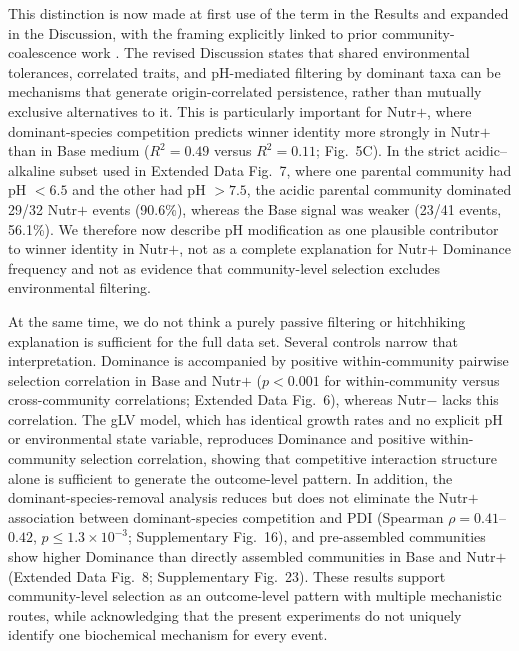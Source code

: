This distinction is now made at first use of the term in the Results and expanded in the Discussion, with the framing explicitly linked to prior community-coalescence work \citep{Mansour2018,Rillig2015}. The revised Discussion states that shared environmental tolerances, correlated traits, and pH-mediated filtering by dominant taxa can be mechanisms that generate origin-correlated persistence, rather than mutually exclusive alternatives to it. This is particularly important for Nutr$+$, where dominant-species competition predicts winner identity more strongly in Nutr$+$ than in Base medium ($R^2 = 0.49$ versus $R^2 = 0.11$; Fig.~5C). In the strict acidic--alkaline subset used in Extended Data Fig.~7, where one parental community had pH $<6.5$ and the other had pH $>7.5$, the acidic parental community dominated 29/32 Nutr$+$ events (90.6\%), whereas the Base signal was weaker (23/41 events, 56.1\%). We therefore now describe pH modification as one plausible contributor to winner identity in Nutr$+$, not as a complete explanation for Nutr$+$ Dominance frequency and not as evidence that community-level selection excludes environmental filtering.

At the same time, we do not think a purely passive filtering or hitchhiking explanation is sufficient for the full data set. Several controls narrow that interpretation. Dominance is accompanied by positive within-community pairwise selection correlation in Base and Nutr$+$ ($p < 0.001$ for within-community versus cross-community correlations; Extended Data Fig.~6), whereas Nutr$-$ lacks this correlation. The gLV model, which has identical growth rates and no explicit pH or environmental state variable, reproduces Dominance and positive within-community selection correlation, showing that competitive interaction structure alone is sufficient to generate the outcome-level pattern. In addition, the dominant-species-removal analysis reduces but does not eliminate the Nutr$+$ association between dominant-species competition and PDI (Spearman $\rho = 0.41$--$0.42$, $p \leq 1.3 \times 10^{-3}$; Supplementary Fig.~16), and pre-assembled communities show higher Dominance than directly assembled communities in Base and Nutr$+$ (Extended Data Fig.~8; Supplementary Fig.~23). These results support community-level selection as an outcome-level pattern with multiple mechanistic routes, while acknowledging that the present experiments do not uniquely identify one biochemical mechanism for every event.

